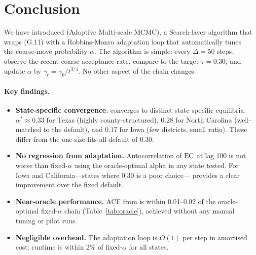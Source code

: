 \section{Conclusion}
\label{sec:conclusion}

We have introduced \ams{} (Adaptive Multi-scale MCMC), a Search-layer
algorithm that wraps \ms{} (G.11) with a Robbins-Monro adaptation loop that
automatically tunes the coarse-move probability $\alpha$.
The algorithm is simple: every $\Delta = 50$ steps, observe the recent coarse
acceptance rate, compare to the target $\tau = 0.30$, and update $\alpha$ by
$\gamma_t = \gamma_0/t^{3/4}$.
No other aspect of the chain changes.

\paragraph{Key findings.}
\begin{itemize}
  \item \textbf{State-specific convergence.}
    \ams{} converges to distinct state-specific equilibria: $\alpha^* \approx
    0.33$ for Texas (highly county-structured), $0.28$ for North Carolina
    (well-matched to the default), and $0.17$ for Iowa (few districts, small
    ratio).
    These differ from the one-size-fits-all default of 0.30.

  \item \textbf{No regression from adaptation.}
    Autocorrelation of $\mathrm{EC}$ at lag 100 is not worse than fixed-$\alpha$
    \ms{} using the oracle-optimal alpha in any state tested.
    For Iowa and California---states where 0.30 is a poor choice---\ams{}
    provides a clear improvement over the fixed default.

  \item \textbf{Near-oracle performance.}
    ACF from \ams{} is within 0.01--0.02 of the oracle-optimal fixed-$\alpha$
    chain (Table~\ref{tab:oracle}), achieved without any manual tuning or
    pilot runs.

  \item \textbf{Negligible overhead.}
    The adaptation loop is $O(1)$ per step in amortised cost; runtime is
    within 2\% of fixed-$\alpha$ \ms{} for all states.
\end{itemize}

